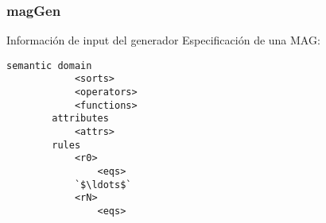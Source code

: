 \documentclass[10pt]{beamer}
\begin{document}
\begin{frame}[fragile]
    \frametitle{magGen}

    \begin{block}{Informaci\'on de input del generador}
        Especificaci\'on de una MAG:
    \end{block}
        
    \begin{lstlisting}[language=specmag, basicstyle=\small]
        semantic domain
            <sorts>
            <operators>
            <functions>
        attributes
            <attrs>
        rules
            <r0>
                <eqs>
            `$\ldots$`
            <rN>
                <eqs>
    \end{lstlisting} 

\end{frame}






\end{document}
